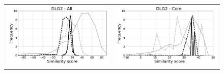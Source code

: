 \documentclass[a4paper,12pt]{article}
\begin{document}
\begin{figure}[t]
\begin{tabular}{cc}
       \includegraphics[width=8.4cm]{rapport/resultats/PDZ/graphe/exactGB/2BYG_simil_cut.png} &
       \includegraphics[width=8.4cm]{rapport/resultats/PDZ/graphe/exactGB/2BYG_simil_core.png} \\
     \end{tabular}
\label{graph:Simil_Proteus_PDZ}
   \end{figure}



   \clearpage
   
\end{document}
